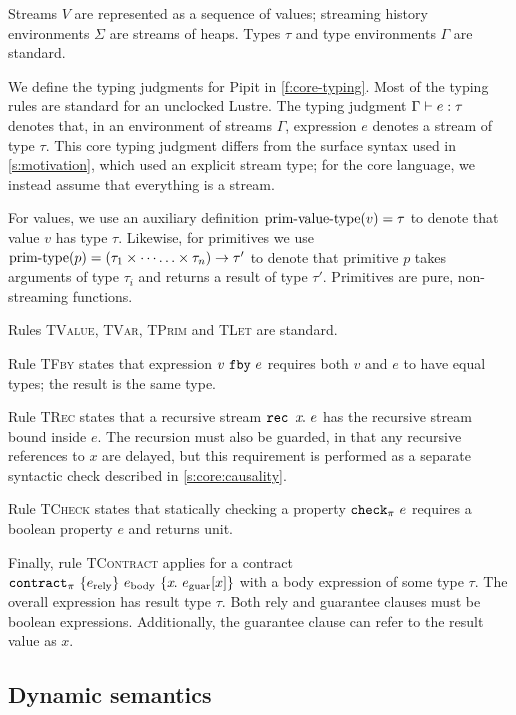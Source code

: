 Streams $V$ are represented as a sequence of values; streaming history environments $\Sigma$ are streams of heaps.
Types $\tau$ and type environments $\Gamma$ are standard.



We define the typing judgments for Pipit in \autoref{f:core-typing}.
Most of the typing rules are standard for an unclocked Lustre.
The typing judgment $\Gamma \vdash e : \tau$ denotes that, in an environment of streams $\Gamma$, expression $e$ denotes a stream of type $\tau$.
This core typing judgment differs from the surface syntax used in \autoref{s:motivation}, which used an explicit stream type; for the core language, we instead assume that everything is a stream.

For values, we use an auxiliary definition $\text{prim-value-type}(v) = \tau$ to denote that value $v$ has type $\tau$.
Likewise, for primitives we use $\text{prim-type}(p) = (\tau_1 \times \cdots \hdots \times \tau_n) \to \tau'$ to denote that primitive $p$ takes arguments of type $\tau_i$ and returns a result of type $\tau'$.
Primitives are pure, non-streaming functions.

Rules \textsc{TValue}, \textsc{TVar}, \textsc{TPrim} and \textsc{TLet} are standard.

Rule \textsc{TFby} states that expression $v~\texttt{fby}~e$ requires both $v$ and $e$ to have equal types; the result is the same type.

Rule \textsc{TRec} states that a recursive stream $\texttt{rec~} x\hspace{-0.1em}.~e$ has the recursive stream bound inside $e$.
The recursion must also be guarded, in that any recursive references to $x$ are delayed, but this requirement is performed as a separate syntactic check described in \autoref{s:core:causality}.

Rule \textsc{TCheck} states that statically checking a property $\texttt{check}_{\pi}~e$ requires a boolean property $e$ and returns unit.

Finally, rule \textsc{TContract} applies for a contract $\texttt{contract}_{\pi}~\{e_{\text{rely}}\}~e_{\text{body}}~\{x\hspace{-0.1em}.~e_{\text{guar}}[x]\}$ with a body expression of some type $\tau$.
The overall expression has result type $\tau$.
Both rely and guarantee clauses must be boolean expressions.
Additionally, the guarantee clause can refer to the result value as $x$.

\subsection{Dynamic semantics}
\label{s:core:dynamic}


